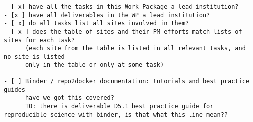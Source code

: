 \begin{draft}
\begin{verbatim}
- [ x] have all the tasks in this Work Package a lead institution?
- [x ] have all deliverables in the WP a lead institution?
- [ x] do all tasks list all sites involved in them?
- [ x ] does the table of sites and their PM efforts match lists of sites for each task?
      (each site from the table is listed in all relevant tasks, and no site is listed
      only in the table or only at some task)

- [ ] Binder / repo2docker documentation: tutorials and best practice guides -
      have we got this covered?
      TO: there is deliverable D5.1 best practice guide for reproducible science with binder, is that what this line mean??
\end{verbatim}
\end{draft}
